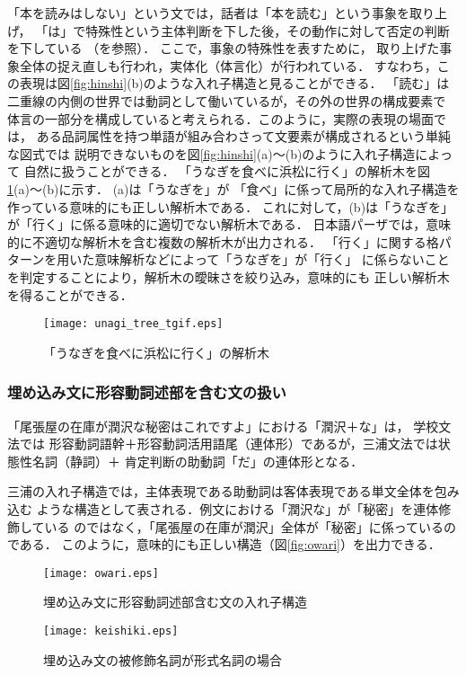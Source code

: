 \documentclass[japanese]{jnlp_1.2}
\begin{document}
「本を読みはしない」という文では，話者は「本を読む」という事象を取り上げ，
「は」で特殊性という主体判断を下した後，その動作に対して否定の判断を下している
（\cite{沼崎他1995}を参照）．
ここで，事象の特殊性を表すために，
取り上げた事象全体の捉え直しも行われ，実体化（体言化）が行われている．
すなわち，この表現は図\ref{fig:hinshi}(b)のような入れ子構造と見ることができる．
「読む」は二重線の内側の世界では動詞として働いているが，その外の世界の構成要素で
体言の一部分を構成していると考えられる．このように，実際の表現の場面では，
ある品詞属性を持つ単語が組み合わさって文要素が構成されるという単純な図式では
説明できないものを図\ref{fig:hinshi}(a)〜(b)のように入れ子構造によって
自然に扱うことができる．
「うなぎを食べに浜松に行く」の解析木を図\ref{fig:unagi_tree_tgif}(a)〜(b)に示す．
(a)は「うなぎを」が
「食べ」に係って局所的な入れ子構造を作っている意味的にも正しい解析木である．
これに対して，(b)は「うなぎを」が「行く」に係る意味的に適切でない解析木である．
日本語パーザでは，意味的に不適切な解析木を含む複数の解析木が出力される．
「行く」に関する格パターンを用いた意味解析などによって「うなぎを」が「行く」
に係らないことを判定することにより，解析木の曖昧さを絞り込み，意味的にも
正しい解析木を得ることができる．

\begin{figure}[b]
  \centering
      \texttt{[image: unagi\_tree\_tgif.eps]}
  \caption{「うなぎを食べに浜松に行く」の解析木} \label{fig:unagi_tree_tgif}
\end{figure}

    \subsubsection{埋め込み文に形容動詞述部を含む文の扱い}
「尾張屋の在庫が潤沢な秘密はこれですよ」における「潤沢＋な」は，
学校文法では
形容動詞語幹＋形容動詞活用語尾（連体形）であるが，三浦文法では状態性名詞（静詞）＋
肯定判断の助動詞「だ」の連体形となる．

三浦の入れ子構造では，主体表現である助動詞は客体表現である単文全体を包み込む
ような構造として表される．例文における「潤沢な」が「秘密」を連体修飾している
のではなく，「尾張屋の在庫が潤沢」全体が「秘密」に係っているのである．
このように，意味的にも正しい構造（図\ref{fig:owari}）を出力できる．

\begin{figure}[t]
  \centering
      \texttt{[image: owari.eps]}
  \caption{埋め込み文に形容動詞述部含む文の入れ子構造} \label{fig:owari}
    \par\vspace{20pt}
      \texttt{[image: keishiki.eps]}
  \caption{埋め込み文の被修飾名詞が形式名詞の場合} \label{fig:keishiki}
\end{figure}
\end{document}
